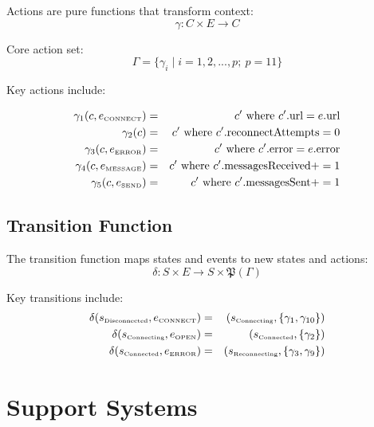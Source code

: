 \documentclass[10pt]{article}
\begin{document}
Actions are pure functions that transform context:
$$\gamma: C \times E \rightarrow C$$

Core action set:
$$\Gamma = \{\gamma_i \mid i=1,2,...,p;\ p=11\}$$

Key actions include:

\begin{eqnarray*}
\gamma_1(c, e_{\text{\tiny CONNECT}}) &=& c' \text{ where } c'.\text{url} = e.\text{url} \\
\gamma_2(c) &=& c' \text{ where } c'.\text{reconnectAttempts} = 0 \\
\gamma_3(c, e_{\text{\tiny ERROR}}) &=& c' \text{ where } c'.\text{error} = e.\text{error} \\
\gamma_4(c, e_{\text{\tiny MESSAGE}}) &=& c' \text{ where } c'.\text{messagesReceived} += 1 \\
\gamma_5(c, e_{\text{\tiny SEND}}) &=& c' \text{ where } c'.\text{messagesSent} += 1
\end{eqnarray*}

\subsection{Transition Function}

The transition function maps states and events to new states and actions:
$$\delta: S \times E \rightarrow S \times \mathfrak{P}(\Gamma)$$

Key transitions include:
\begin{eqnarray*}
\delta(s_{\text{\tiny Disconnected}}, e_{\text{\tiny CONNECT}}) &=& (s_{\text{\tiny Connecting}}, \{\gamma_1, \gamma_{10}\}) \\
\delta(s_{\text{\tiny Connecting}}, e_{\text{\tiny OPEN}}) &=& (s_{\text{\tiny Connected}}, \{\gamma_2\}) \\
\delta(s_{\text{\tiny Connected}}, e_{\text{\tiny ERROR}}) &=& (s_{\text{\tiny Reconnecting}}, \{\gamma_3, \gamma_9\})
\end{eqnarray*}


\section{Support Systems}

\end{document}
